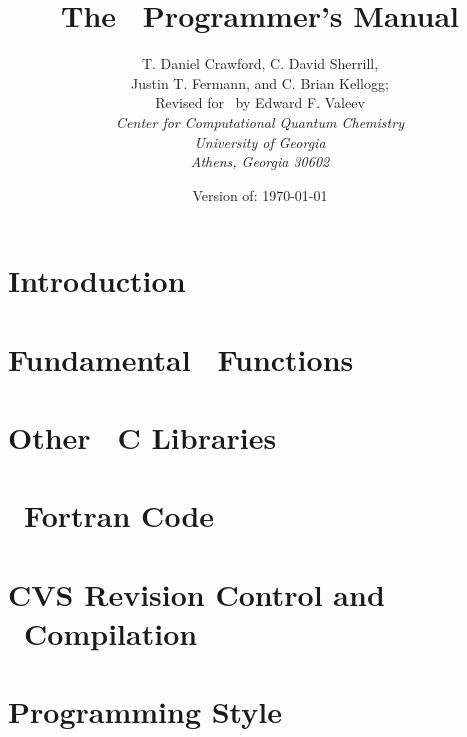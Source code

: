 \documentclass[12pt]{article}
\begin{document}


\initfuncdesc

\title{\vspace{2.0in} {\bf The \PSIthree\ Programmer's Manual}}

\author{T. Daniel Crawford, C. David Sherrill, \\
Justin T. Fermann, and C. Brian Kellogg; \\ 
Revised for \PSIthree\ by Edward F. Valeev \\
{\em Center for Computational Quantum Chemistry} \\
{\em University of Georgia} \\ 
{\em Athens, Georgia 30602}}

\date{Version of:  \today}
\maketitle
\thispagestyle{empty}

\newpage
\tableofcontents

\newpage
\section{Introduction}



\section{Fundamental \PSIthree\ Functions}\label{Fundamental_PSI}


\section{Other \PSIthree\ C Libraries}\label{Other_Libs}


\section{\PSIthree\ Fortran Code}\label{PSI_Fortran}


\section{CVS Revision Control and \PSIthree\ Compilation}\label{CVS}


\section{Programming Style}\label{Style}

\end{document}

